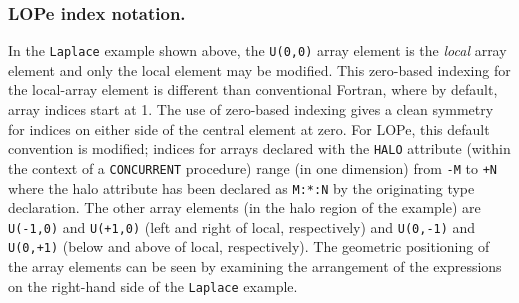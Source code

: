 \subsubsection{LOPe index notation.}

In the \texttt{Laplace} example shown above, the \texttt{U(0,0)} array
element is the \emph{local} array element and only the local element
may be modified.  This zero-based indexing for the local-array element
is different than conventional Fortran, where by default, array
indices start at 1.  The use of zero-based indexing gives a clean
symmetry for indices on either side of the central element at zero.
For LOPe, this default convention is modified; indices for arrays
declared with the \texttt{HALO} attribute (within the context of a
\texttt{CONCURRENT} procedure) range (in one dimension) from
\texttt{-M} to \texttt{+N} where the halo attribute has been declared
as \texttt{M:*:N} by the originating type declaration.  The other
array elements (in the halo region of the example) are
\texttt{U(-1,0)} and \texttt{U(+1,0)} (left and right of local,
respectively) and \texttt{U(0,-1)} and \texttt{U(0,+1)} (below and
above of local, respectively).  The geometric positioning of the array
elements can be seen by examining the arrangement of the expressions
on the right-hand side of the \texttt{Laplace} example.
